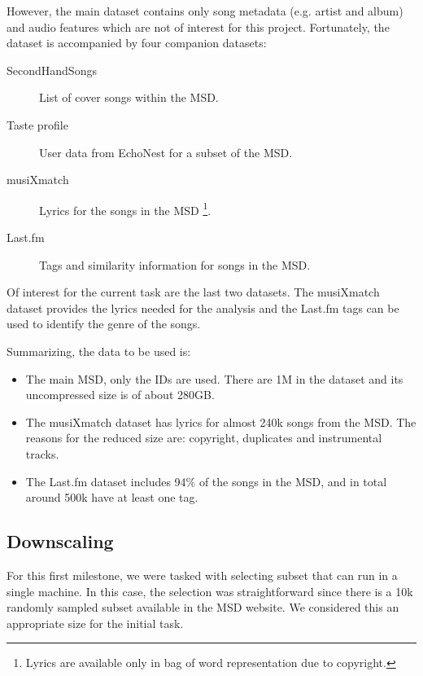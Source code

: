\documentclass[11pt,a4paper,twoside]{scrartcl}
\begin{document}
    However, the main dataset contains only song metadata
    (e.g. artist and album) and audio features which are not of interest
    for this project. Fortunately, the dataset is accompanied by four companion
    datasets:
    
    \begin{description}
      \item[SecondHandSongs] List of cover songs within the MSD.
      \item[Taste profile] User data from EchoNest for a subset of the MSD.
      \item[musiXmatch] Lyrics for the songs in the MSD
                        \footnote{Lyrics are available only in bag of word
                                  representation due to copyright.}.
      \item[Last.fm] Tags and similarity information for songs in the MSD.
    \end{description}
    
    Of interest for the current task are the last two datasets. The musiXmatch
    dataset provides the lyrics needed for the analysis and the Last.fm tags can
    be used to identify the genre of the songs.
    
    Summarizing, the data to be used is:
    
    \begin{itemize}
      \item The main MSD, only the IDs are used. There are 1M in the
            dataset and its uncompressed size is of about 280GB.
      \item The musiXmatch dataset has lyrics for almost 240k songs from the
            MSD. The reasons for the reduced size are: copyright, duplicates and
            instrumental tracks.
      \item The Last.fm dataset includes 94\% of the songs in the MSD, and in
            total around 500k have at least one tag.
    \end{itemize}

    \subsection{Downscaling}
    For this first milestone, we were tasked with selecting subset that can
    run in a single machine. In this case, the selection was straightforward
    since there is a 10k randomly sampled subset available in the MSD website.
    We considered this an appropriate size for the initial task.
    
\end{document}
